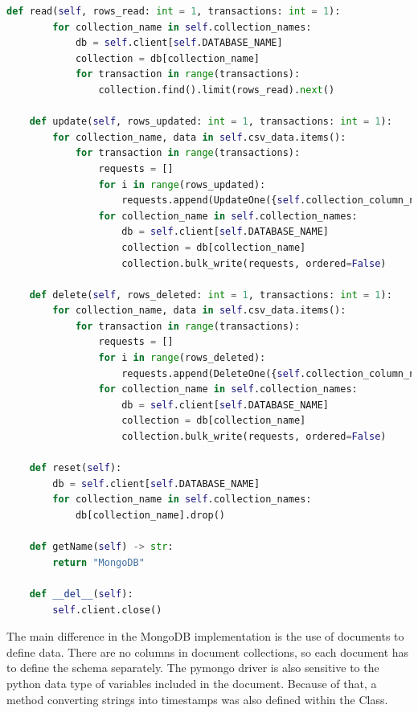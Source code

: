 \begin{lstlisting}[language=Python, caption=MongoDatabaseTesting]
    def read(self, rows_read: int = 1, transactions: int = 1):
        for collection_name in self.collection_names:
            db = self.client[self.DATABASE_NAME]
            collection = db[collection_name]
            for transaction in range(transactions):
                collection.find().limit(rows_read).next()

    def update(self, rows_updated: int = 1, transactions: int = 1):
        for collection_name, data in self.csv_data.items():
            for transaction in range(transactions):
                requests = []
                for i in range(rows_updated):
                    requests.append(UpdateOne({self.collection_column_names[collection_name][0]: self.__convert_timestamp(self.csv_data[collection_name][i][0]), self.collection_column_names[collection_name][1]: self.__convert_timestamp(self.csv_data[collection_name][i][1])}, {'$set': {self.collection_column_names[collection_name][2]: 0}}))
                for collection_name in self.collection_names:
                    db = self.client[self.DATABASE_NAME]
                    collection = db[collection_name]
                    collection.bulk_write(requests, ordered=False)

    def delete(self, rows_deleted: int = 1, transactions: int = 1):
        for collection_name, data in self.csv_data.items():
            for transaction in range(transactions):
                requests = []
                for i in range(rows_deleted):
                    requests.append(DeleteOne({self.collection_column_names[collection_name][0]: self.__convert_timestamp(self.csv_data[collection_name][i][0]), self.collection_column_names[collection_name][1]: self.__convert_timestamp(self.csv_data[collection_name][i][1])}))
                for collection_name in self.collection_names:
                    db = self.client[self.DATABASE_NAME]
                    collection = db[collection_name]
                    collection.bulk_write(requests, ordered=False)

    def reset(self):
        db = self.client[self.DATABASE_NAME]
        for collection_name in self.collection_names:
            db[collection_name].drop()

    def getName(self) -> str:
        return "MongoDB"

    def __del__(self):
        self.client.close()
\end{lstlisting}
\par The main difference in the MongoDB implementation is the use of documents to define data. There are no columns in document collections, so each document has to define the schema separately. The pymongo driver is also sensitive to the python data type of variables included in the document. Because of that, a method converting strings into timestamps was also defined within the Class.
